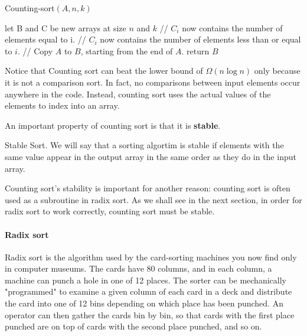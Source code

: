 \begin{algbox}{Counting-sort$(A, n, k)$}
  \begin{algorithm}[H]
  	let B and C be new arrays at size $n$ and $k$
	// $C_{i}$ now contains the number of elements equal to i.
	// $C_{i}$ now contains the number of elements less than or equal to $i$.
	// Copy $A$ to $B$, starting from the end of $A$.
	  return $B$
  \end{algorithm}
\end{algbox}

Notice that Counting sort can beat the lower bound of $\Omega\left(n \log n\right)$ only because it is not a comparison sort. In fact, no comparisons between input elements occur anywhere in the code. Instead, counting sort uses the actual values of the elements to index into an array.

An important property of counting sort is that it is \textbf{stable}.

\begin{defbox}{Stable Sort.}
 We will say that a sorting algortim is stable if elements with the same value appear in the output array in the same order as they do in the input array. \end{defbox}

Counting sort's stability is important for another reason: counting sort is often used as a subroutine in radix sort. As we shall see in the next section, in order for radix sort to work correctly, counting sort must be stable.

\paragraph{Radix sort}
Radix sort is the algorithm used by the card-sorting machines you now find only in computer museums. The cards have 80 columns, and in each column, a machine can punch a hole in one of 12 places. The sorter can be mechanically "programmed" to examine a given column of each card in a deck and distribute the card into one of 12 bins depending on which place has been punched. An operator can then gather the cards bin by bin, so that cards with the first place punched are on top of cards with the second place punched, and so on.


